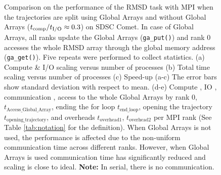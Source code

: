 \begin{figure}[ht!]
\caption{Comparison on the performance of the RMSD task with MPI when the trajectories are split using Global Arrays and without Global Arrays (${t}_{\text{comp}}/{t}_{\text{I/O}} \approx 0.3$) on SDSC Comet.
In case of Global Arrays, all ranks update the Global Arrays (\texttt{ga\_put()}) and rank 0 accesses the whole RMSD array through the global memory address (\texttt{ga\_get()}).
Five repeats were performed to collect statistics. (a) Compute \& I/O scaling versus number of processes (b) Total time scaling versus number of processes (c) Speed-up (a-c) The error bars show standard deviation with respect to mean. (d-e) Compute \tcomp, IO \tIO, communication \tcomm, access to the whole Global Arrays by rank 0, $t_{\text{Access\_Global\_Array}}$, ending the for loop $t_{\text{end\_loop}}$,
  opening the trajectory $t_{\text{opening\_trajectory}}$, and overheads $t_{\text{overhead1}}$, $t_{\text{overhead2}}$ per MPI rank (See Table \ref{tab:notation} for the definition). When Global Arrays is not used, the performance is affected due to the non-uniform communication time across different ranks. However, when Global Arrays is used communication time has significantly reduced and scaling is close to ideal. \textbf{Note:} In serial, there is no communication.}
\label{fig:MPIwithIO-split}
\end{figure}

